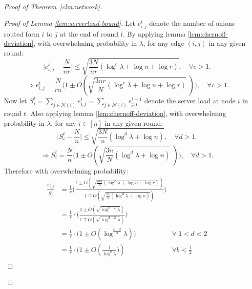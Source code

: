 \begin{proof} [Proof of Theorem~\ref{clm:network}]
\begin{proof}[Proof of Lemma \ref{lem:serverload-bound}]
Let $e^t_{i,j}$ denote the number of onions routed form $i$ to $j$ at the end of round $t$. By applying lemma \ref{lem:chernoff-deviation}, with overwhelming probability in $\lambda$, for any edge $(i,j)$ in any given round:
$$
\Big|e^t_{i,j} - \frac{N}{nr}\Big| \leq \sqrt{\frac{3N}{nr}(\log^c \lambda + \log n + \log r)}, \quad \forall c > 1.
$$
$$
\Rightarrow e^t_{i,j} = \frac{N}{rn}\Big(1 \pm O(\sqrt{\frac{3nr}{N}(\log^c \lambda + \log n + \log r)} \; )\Big), \quad \forall c > 1.
$$
Now let $S^t_i = \sum_{j \in \mathcal{N}(i)} e^t_{i,j} = \sum_{j \in \mathcal{N}(i)} e^{t - 1}_{j,i}$ denote the server load at node $i$ in round $t$. Also applying lemma \ref{lem:chernoff-deviation}, with overwhelming probability in $\lambda$, for any $i \in [n]$ in any given round:
$$
\Big|S^t_i - \frac{N}{n}\Big| \leq \sqrt{\frac{3N}{n}(\log^d \lambda + \log n)}, \quad \forall d > 1.
$$
$$
\Rightarrow S^t_i = \frac{N}{n}\Big(1 \pm O(\sqrt{\frac{3n}{N}(\log^d \lambda + \log n)} \; ) \Big), \quad \forall d > 1.
$$
Therefore with overwhelming probability:
\begin{align*}
\frac{e^t_{i,j}}{S^t_i} &= \frac{1}{r}\Big(\frac{1 \pm O(\sqrt{\frac{3nr}{N}(\log^c \lambda + \log n + \log r)})}{1 \mp O(\sqrt{\frac{3n}{N}(\log^d \lambda + \log n)})}\Big)\\
                        &= \frac{1}{r} \cdot \Big(\frac{1 \pm O(\sqrt{\log^{c - 2} \lambda})}{1 \mp O(\sqrt{\log^{d - 2} \lambda})}\Big)\\
                        &= \frac{1}{r} \cdot \Big(1 \pm O(\log^{\frac{c - 2}{2}} \lambda)\Big) &\forall \; 1 < d < 2\\
                        &= \frac{1}{r} \cdot \Big(1 \pm O(\frac{1}{\log^{b} \lambda}\Big)) &\forall b < \frac{1}{2}\\
\end{align*}


\end{proof}
\end{proof}
